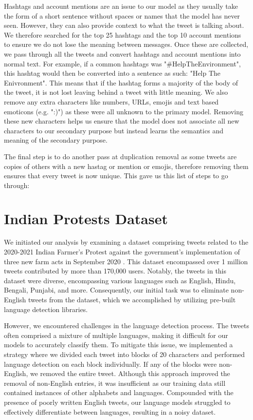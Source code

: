 Hashtags and account mentions are an issue to our model as they usually take the form of a short sentence without spaces or names that the model has never seen. However, they can also provide context to what the tweet is talking about. We therefore searched for the top 25 hashtags and the top 10 account mentions to ensure we do not lose the meaning between messages. Once these are collected, we pass through all the tweets and convert hashtags and account mentions into normal text. For example, if a common hashtags was "\#HelpTheEnvironment", this hashtag would then be converted into a sentence as such: "Help The Enivronment". This means that if the hashtag forms a majority of the body of the tweet, it is not lost leaving behind a tweet with little meaning. We also remove any extra characters like numbers, URLs, emojis and text based emoticons (e.g. ":)") as these were all unknown to the primary model. Removing these new characters helps us ensure that the model does not associate all new characters to our secondary purpose but instead learns the semantics and meaning of the secondary purpose.

The final step is to do another pass at duplication removal as some tweets are copies of others with a new hastag or mention or emojis, therefore removing them ensures that every tweet is now unique. This gave us this list of steps to go through:

\section{Indian Protests Dataset}
We initiated our analysis by examining a dataset comprising tweets related to the 2020-2021 Indian Farmer's Protest against the government's implementation of three new farm acts in September 2020 \cite{indian-protest-dataset}. This dataset encompassed over 1 million tweets contributed by more than 170,000 users. Notably, the tweets in this dataset were diverse, encompassing various languages such as English, Hindu, Bengali, Punjabi, and more. Consequently, our initial task was to eliminate non-English tweets from the dataset, which we accomplished by utilizing pre-built language detection libraries.

However, we encountered challenges in the language detection process. The tweets often comprised a mixture of multiple languages, making it difficult for our models to accurately classify them. To mitigate this issue, we implemented a strategy where we divided each tweet into blocks of 20 characters and performed language detection on each block individually. If any of the blocks were non-English, we removed the entire tweet. Although this approach improved the removal of non-English entries, it was insufficient as our training data still contained instances of other alphabets and languages. Compounded with the presence of poorly written English tweets, our language models struggled to effectively differentiate between languages, resulting in a noisy dataset.

